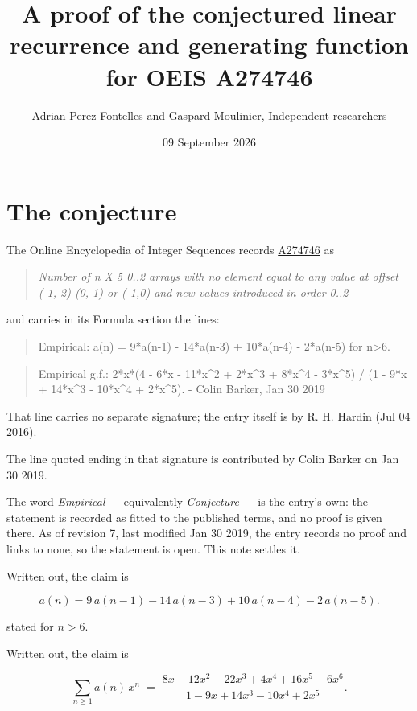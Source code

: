 \documentclass[11pt]{article}
\title{A proof of the conjectured linear recurrence and generating function for OEIS A274746}
\author{Adrian Perez Fontelles and Gaspard Moulinier, Independent researchers}
\date{09 September 2026}
\theoremstyle{definition}
\begin{document}
\maketitle
\section{The conjecture}

The Online Encyclopedia of Integer Sequences records \href{https://oeis.org/A274746}{A274746} as

\begin{quote}\itshape Number of n X 5 0..2 arrays with no element equal to any value at offset (-1,-2) (0,-1) or (-1,0) and new values introduced in order 0..2\end{quote}

and carries in its Formula section the lines:

\begin{quote}\ttfamily Empirical: a(n) = 9*a(n-1) - 14*a(n-3) + 10*a(n-4) - 2*a(n-5) for n>6.\end{quote}

\begin{quote}\ttfamily Empirical g.f.: 2*x*(4 - 6*x - 11*x\textasciicircum{}2 + 2*x\textasciicircum{}3 + 8*x\textasciicircum{}4 - 3*x\textasciicircum{}5) / (1 - 9*x + 14*x\textasciicircum{}3 - 10*x\textasciicircum{}4 + 2*x\textasciicircum{}5). - Colin Barker, Jan 30 2019\end{quote}

That line carries no separate signature; the entry itself is by R. H. Hardin (Jul 04 2016).

The line quoted ending in that signature is contributed by Colin Barker on Jan 30 2019.

The word {\itshape Empirical} --- equivalently {\itshape Conjecture} --- is the entry's own: the statement is recorded as fitted to the published terms, and no proof is given there. As of revision 7, last modified Jan 30 2019, the entry records no proof and links to none, so the statement is open. This note settles it.

Written out, the claim is

\[a(n) = 9\,a(n-1) - 14\,a(n-3) + 10\,a(n-4) - 2\,a(n-5).\]

stated for $n > 6$.

Written out, the claim is

\[\sum_{n \ge 1} a(n)\,x^n \;=\; \frac{8x - 12x^{2} - 22x^{3} + 4x^{4} + 16x^{5} - 6x^{6}}{1 - 9x + 14x^{3} - 10x^{4} + 2x^{5}}.\]
\end{document}
